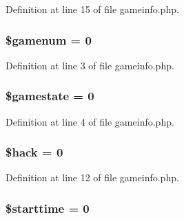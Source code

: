 Definition at line 15 of file gameinfo.\+php.

\hypertarget{install_2gameinfo_8php_a98c5bf2ec517c70a0b24d0486da99fbf}{
\subsubsection[{\$gamenum}]{\setlength{\rightskip}{0pt plus 5cm}\$gamenum = 0}}\label{install_2gameinfo_8php_a98c5bf2ec517c70a0b24d0486da99fbf}


Definition at line 3 of file gameinfo.\+php.

\hypertarget{install_2gameinfo_8php_a3d9f29a8eb6c28b1e2a35cc7a6c61baa}{
\subsubsection[{\$gamestate}]{\setlength{\rightskip}{0pt plus 5cm}\$gamestate = 0}}\label{install_2gameinfo_8php_a3d9f29a8eb6c28b1e2a35cc7a6c61baa}


Definition at line 4 of file gameinfo.\+php.

\hypertarget{install_2gameinfo_8php_a3403384c1a586a131e24cd874485de0a}{
\subsubsection[{\$hack}]{\setlength{\rightskip}{0pt plus 5cm}\${\bf hack} = 0}}\label{install_2gameinfo_8php_a3403384c1a586a131e24cd874485de0a}


Definition at line 12 of file gameinfo.\+php.

\hypertarget{install_2gameinfo_8php_af757b2eb3e5f4761dd88804929e413ea}{
\subsubsection[{\$starttime}]{\setlength{\rightskip}{0pt plus 5cm}\$starttime = 0}}\label{install_2gameinfo_8php_af757b2eb3e5f4761dd88804929e413ea}


